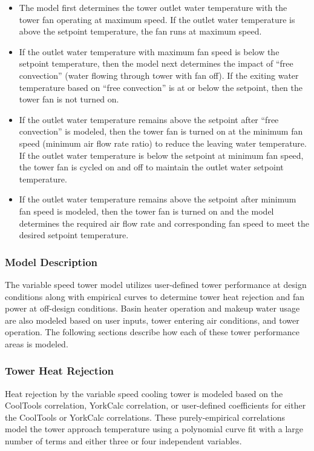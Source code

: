 \begin{itemize}
\item The model first determines the tower outlet water temperature with the tower fan operating at maximum speed. If the outlet water temperature is above the setpoint temperature, the fan runs at maximum speed.
\item If the outlet water temperature with maximum fan speed is below the setpoint temperature, then the model next determines the impact of ``free convection'' (water flowing through tower with fan off). If the exiting water temperature based on ``free convection'' is at or below the setpoint, then the tower fan is not turned on.
\item If the outlet water temperature remains above the setpoint after ``free convection'' is modeled, then the tower fan is turned on at the minimum fan speed (minimum air flow rate ratio) to reduce the leaving water temperature. If the outlet water temperature is below the setpoint at minimum fan speed, the tower fan is cycled on and off to maintain the outlet water setpoint temperature.
\item If the outlet water temperature remains above the setpoint after minimum fan speed is modeled, then the tower fan is turned on and the model determines the required air flow rate and corresponding fan speed to meet the desired setpoint temperature.
\end{itemize}

\subsubsection{Model Description}\label{model-description-1-005}

The variable speed tower model utilizes user-defined tower performance at design conditions along with empirical curves to determine tower heat rejection and fan power at off-design conditions. Basin heater operation and makeup water usage are also modeled based on user inputs, tower entering air conditions, and tower operation. The following sections describe how each of these tower performance areas is modeled.

\subsubsection{Tower Heat Rejection}\label{tower-heat-rejection}

Heat rejection by the variable speed cooling tower is modeled based on the CoolTools correlation, YorkCalc correlation, or user-defined coefficients for either the CoolTools or YorkCalc correlations. These purely-empirical correlations model the tower approach temperature using a polynomial curve fit with a large number of terms and either three or four independent variables.

